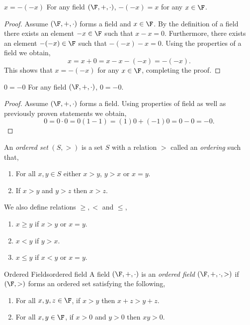 \documentclass{report}
\begin{document}
\begin{lemma}{$x = -(-x)$}{}
  For any field $\left(\F, +, \cdot\right)$, $-(-x) = x$ for any $x \in \F$.
\end{lemma}

\begin{proof}
  Assume $\left(\F, +, \cdot\right)$ forms a field and $x \in \F$.
  By the definition of a field there exists an element $-x \in \F$ such that $x - x = 0$.
  Furthermore, there exists an element $-(-x) \in \F$ such that $-(-x) - x = 0$.
  Using the properties of a field we obtain,
  $$x = x + 0 = x - x -(-x) = -(-x).$$
  This shows that $x = -(-x)$ for any $x \in \F$, completing the proof.
\end{proof}

\begin{lemma}{$0 = -0$}{}
  For any field $\left(\F, +, \cdot\right)$, $0 = -0$.
\end{lemma}

\begin{proof}
  Assume $\left(\F, +, \cdot\right)$ forms a field.
  Using properties of field as well as previously proven statements we obtain,
  $$0 = 0 \cdot 0 = 0(1 - 1) = (1)0 + (-1)0 = 0 - 0 = -0.$$
\end{proof}

\begin{definition}{}{}
  An \emph{ordered set} $\left(S, >\right)$ is a set $S$ with a relation $>$ called an \emph{ordering} such that,
  \begin{enumerate}[label=(\roman*)]
    \item For all $x, y \in S$ either $x > y$, $y > x$ or $x = y$.
    \item If $x > y$ and $y > z$ then $x > z$.
  \end{enumerate}
  We also define relations $\geq, <$ and $\leq$,
  \begin{enumerate}[label=(\roman*)]
    \item $x \geq y$ if $x > y$ or $x = y$.
    \item $x < y$ if $y > x$.
    \item $x \leq y$ if $x < y$ or $x = y$.
  \end{enumerate}
\end{definition}

\begin{definition}{Ordered Fields}{ordered field}
  A field $\left(\F, +, \cdot\right)$ is an \emph{ordered field} $\left(\F, +, \cdot, > \right)$ if $\left(\F, >\right)$ forms an ordered set satisfying the following,
  \begin{enumerate}[label=(\roman*)]
    \item For all $x,y,z \in \F$, if $x > y$ then $x + z > y + z$.
    \item For all $x,y \in \F$, if $x > 0$ and $y > 0$ then $xy > 0$.
  \end{enumerate}
\end{definition}
\end{document}
